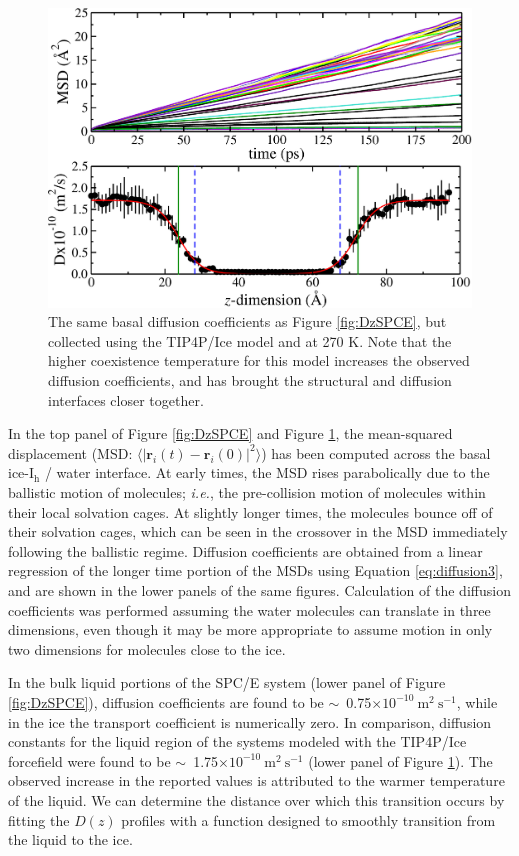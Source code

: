 \begin{figure}
\includegraphics[width=\linewidth]{Figures/DzTIP4PIce}
\caption{\label{fig:DzTIP4PIce} The same basal diffusion coefficients
  as Figure \ref{fig:DzSPCE}, but collected using the TIP4P/Ice model
  and at 270 K. Note that the higher coexistence temperature for this
  model increases the observed diffusion coefficients, and has brought
  the structural and diffusion interfaces closer together.}
\end{figure}

In the top panel of Figure \ref{fig:DzSPCE} and Figure
\ref{fig:DzTIP4PIce}, the mean-squared displacement (MSD:
$\langle | \mathbf{r}_i(t) - \mathbf{r}_i(0) |^2 \rangle $) has been
computed across the basal ice-I$_\mathrm{h}$ / water interface. At
early times, the MSD rises parabolically due to the ballistic motion
of molecules; \textit{i.e.}, the pre-collision motion of molecules
within their local solvation cages. At slightly longer times, the
molecules bounce off of their solvation cages, which can be seen in
the crossover in the MSD immediately following the ballistic
regime. Diffusion coefficients are obtained from a linear regression
of the longer time portion of the MSDs using Equation
\eqref{eq:diffusion3}, and are shown in the lower panels of the same
figures. Calculation of the diffusion coefficients was performed
assuming the water molecules can translate in three dimensions, even
though it may be more appropriate to assume motion in only two
dimensions for molecules close to the ice.

In the bulk liquid portions of the SPC/E system (lower panel of
Figure \ref{fig:DzSPCE}), diffusion coefficients are found to be
$\sim$~0.75$\times 10^{-10}~\mathrm{m}^{2}~\mathrm{s}^{-1 }$, while in
the ice the transport coefficient is numerically zero. In comparison,
diffusion constants for the liquid region of the systems modeled with
the TIP4P/Ice forcefield were found to be
$\sim$~1.75$\times 10^{-10}~\mathrm{m}^{2}~\mathrm{s}^{-1 }$ (lower
panel of Figure \ref{fig:DzTIP4PIce}). The observed increase in the
reported values is attributed to the warmer temperature of the
liquid. We can determine the distance over which this transition
occurs by fitting the $D(z)$ profiles with a function designed to
smoothly transition from the liquid to the ice.

